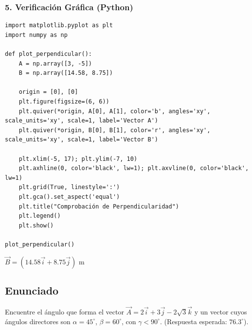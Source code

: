 \documentclass[12pt, a4paper]{article}
\begin{document}
\subsubsection*{5. Verificación Gráfica (Python)}
\begin{lstlisting}
import matplotlib.pyplot as plt
import numpy as np

def plot_perpendicular():
    A = np.array([3, -5])
    B = np.array([14.58, 8.75])
    
    origin = [0], [0]
    plt.figure(figsize=(6, 6))
    plt.quiver(*origin, A[0], A[1], color='b', angles='xy', scale_units='xy', scale=1, label='Vector A')
    plt.quiver(*origin, B[0], B[1], color='r', angles='xy', scale_units='xy', scale=1, label='Vector B')
    
    plt.xlim(-5, 17); plt.ylim(-7, 10)
    plt.axhline(0, color='black', lw=1); plt.axvline(0, color='black', lw=1)
    plt.grid(True, linestyle=':')
    plt.gca().set_aspect('equal')
    plt.title("Comprobación de Perpendicularidad")
    plt.legend()
    plt.show()

plot_perpendicular()
\end{lstlisting}

\begin{tcolorbox}[colback=green!5!white, colframe=green!50!black, title=Respuesta Final]
\centering \Large $\vec{B} = (14.58\vec{i} + 8.75\vec{j}) \text{ m}$
\end{tcolorbox}

\newpage

\subsection*{Enunciado}
Encuentre el ángulo que forma el vector $\vec{A} = 2\vec{i} + 3\vec{j} - 2\sqrt{3}\vec{k}$ y un vector cuyos ángulos directores son $\alpha = 45^\circ$, $\beta = 60^\circ$, con $\gamma < 90^\circ$. (Respuesta esperada: $76.3^\circ$).

\begin{center}
\end{center}
\end{document}
